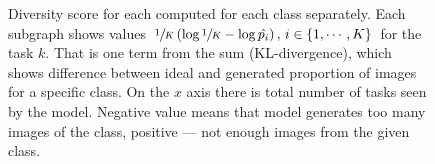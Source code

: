 \begin{figure}[t!]
	\centering
	 \hfill
	\hfill
	\caption{Diversity score for each computed for each class separately. Each subgraph shows values $\sfrac1K \left(\log\sfrac1K - \log\hat{p_i}\right), \, i \in \{1, \cdots, K\}$ for the task $k$. That is one term from the sum (KL-divergence), which shows difference between ideal and generated proportion of images for a specific class. On the $x$ axis there is total number of tasks seen by the model. Negative value means that model generates too many images of the class, positive --- not enough images from the given class. }\label{fig:online:Div_pertask}
	\vspace*{\baselineskip}
\end{figure}

